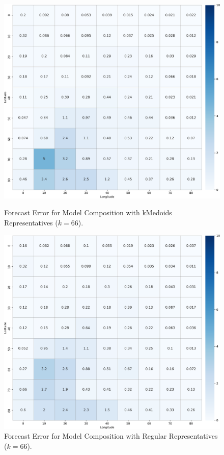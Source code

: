 \begin{figure}[!htbp]
  \centering
  \begin{minipage}[b]{0.45\textwidth}
    \includegraphics[width=\textwidth]{../Figures/query_10x10_kmedoids_k66-1000dpi}
    \caption{Forecast Error for Model Composition with kMedoids Representatives ($k=66$).}
    \label{Fig:kMedoid_10x10_k66}
  \end{minipage}
  \hfill
  \begin{minipage}[b]{0.45\textwidth}
    \includegraphics[width=\textwidth]{../Figures/query_10x10_regular_k66-1000dpi}
    \caption{Forecast Error for Model Composition with Regular Representatives ($k=66$).}
    \label{Fig:Regular_10x10_k66}
  \end{minipage}


\end{figure}
